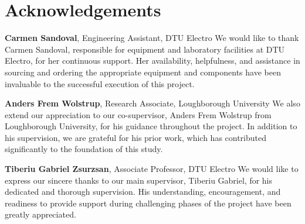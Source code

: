 \section*{Acknowledgements}

\textbf{Carmen Sandoval}, Engineering Assistant, DTU Electro \newline
We would like to thank Carmen Sandoval, responsible for equipment and laboratory facilities at DTU Electro, for her continuous support. Her availability, helpfulness, and assistance in sourcing and ordering the appropriate equipment and components have been invaluable to the successful execution of this project.

\textbf{Anders Frem Wolstrup}, Research Associate, Loughborough University \newline
We also extend our appreciation to our co-supervisor, Anders Frem Wolstrup from Loughborough University, for his guidance throughout the project. In addition to his supervision, we are grateful for his prior work, which has contributed significantly to the foundation of this study.

\textbf{Tiberiu Gabriel Zsurzsan}, Associate Professor, DTU Electro \newline
We would like to express our sincere thanks to our main supervisor, Tiberiu Gabriel, for his dedicated and thorough supervision. His understanding, encouragement, and readiness to provide support during challenging phases of the project have been greatly appreciated.